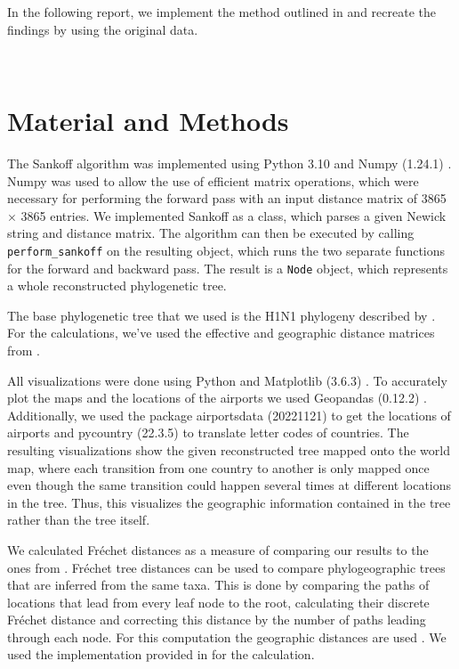 \documentclass{article}
\begin{document}
In the following report, we implement the method outlined in
\cite{reimeringPhylogeographicReconstructionUsing2020} and recreate the findings
by using the original data.

\ \\
\section{Material and Methods}
The Sankoff algorithm was implemented using Python 3.10
\cite{pythonsoftwarefoundationWelcomePythonOrg2023} and Numpy (1.24.1) \cite{harrisArrayProgrammingNumPy2020}. Numpy was used to allow the use of
efficient matrix operations, which were necessary for performing the forward pass with an input distance matrix of 3865 $\times$ 3865 entries. We implemented Sankoff as a class, which parses a given Newick string and distance matrix. The algorithm can then be executed by calling \texttt{perform\_sankoff} on the resulting object, which runs the two separate functions for the forward and backward pass. The result is a \texttt{Node} object, which represents a whole reconstructed phylogenetic tree.

The base phylogenetic tree that we used is the H1N1 phylogeny described by
\cite{reimeringPhylogeographicReconstructionUsing2020}. For the calculations,
we've used the effective and geographic distance matrices from
\cite{reimeringDistanceMatricesParsimonious2019}. 

All visualizations were done using Python and Matplotlib (3.6.3) \cite{MatplotlibVisualizationPython}. To accurately plot the maps and the locations of the
airports we used Geopandas (0.12.2) \cite{GeoPandas12GeoPandas}. Additionally, we used the package airportsdata (20221121) \cite{borsettiAirportsdataExtensiveDatabase2022} to get the locations of
airports and pycountry (22.3.5) \cite{theunePycountryISOCountry} to translate letter codes
of countries. The resulting visualizations show the given reconstructed tree mapped onto the world map, where each transition from one country to another is only mapped once even though the same transition could happen several times at different locations in the tree. Thus, this visualizes the geographic information contained in the tree rather than the tree itself.

We calculated Fr\'{e}chet distances as a measure of comparing our results to the ones from \cite{reimeringPhylogeographicReconstructionUsing2020}. Fr\'{e}chet tree distances can be used to compare phylogeographic trees that are inferred from the same taxa. This is done by comparing the paths of locations that lead from every leaf node to the root, calculating their discrete Fr\'{e}chet distance and correcting this distance by the number of paths leading through each node. For this computation the geographic distances are used \cite{reimeringFrechetTreeDistance2018}. We used the implementation provided in \cite{reimeringFrechetTreeDistance2018} for the calculation.
\end{document}
